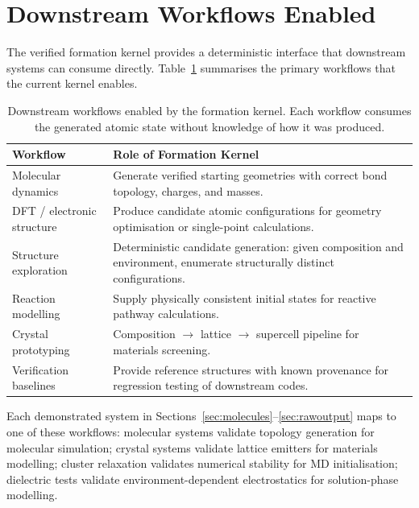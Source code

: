\documentclass[11pt,twoside]{article}
\begin{document}
\section{Downstream Workflows Enabled}
\label{sec:workflows}

The verified formation kernel provides a deterministic interface that downstream systems can consume directly. Table~\ref{tab:workflows} summarises the primary workflows that the current kernel enables.

\begin{table}[H]
\centering
\caption{Downstream workflows enabled by the formation kernel. Each workflow consumes the generated atomic state without knowledge of how it was produced.}
\label{tab:workflows}
\begin{tabular}{lp{9cm}}
\toprule
\textbf{Workflow} & \textbf{Role of Formation Kernel} \\
\midrule
Molecular dynamics        & Generate verified starting geometries with correct bond topology, charges, and masses. \\
DFT / electronic structure & Produce candidate atomic configurations for geometry optimisation or single-point calculations. \\
Structure exploration      & Deterministic candidate generation: given composition and environment, enumerate structurally distinct configurations. \\
Reaction modelling         & Supply physically consistent initial states for reactive pathway calculations. \\
Crystal prototyping        & Composition $\rightarrow$ lattice $\rightarrow$ supercell pipeline for materials screening. \\
Verification baselines     & Provide reference structures with known provenance for regression testing of downstream codes. \\
\bottomrule
\end{tabular}
\end{table}

Each demonstrated system in Sections~\ref{sec:molecules}--\ref{sec:rawoutput} maps to one of these workflows: molecular systems validate topology generation for molecular simulation; crystal systems validate lattice emitters for materials modelling; cluster relaxation validates numerical stability for MD initialisation; dielectric tests validate environment-dependent electrostatics for solution-phase modelling.


\end{document}
